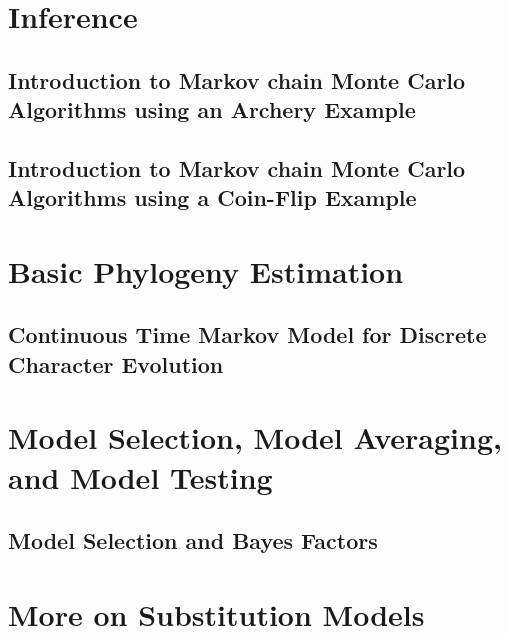 \documentclass[11pt]{book}
\begin{document}
\part{Inference}

\chapter{Introduction to Markov chain Monte Carlo Algorithms using an Archery Example}
\def \ResourcePath {RB_MCMC_Archery_Tutorial/}


\chapter{Introduction to Markov chain Monte Carlo Algorithms using a Coin-Flip Example}
\def \ResourcePath {RB_MCMC_Binomial_Tutorial/}


%


\part{Basic Phylogeny Estimation}

\chapter{Continuous Time Markov Model for Discrete Character Evolution}
\def \ResourcePath {RB_CTMC_Tutorial/}



\part{Model Selection, Model Averaging, and Model Testing}

\chapter{Model Selection and Bayes Factors}
\def \ResourcePath {RB_BayesFactor_Tutorial/}



\part{More on Substitution Models}
\end{document}
